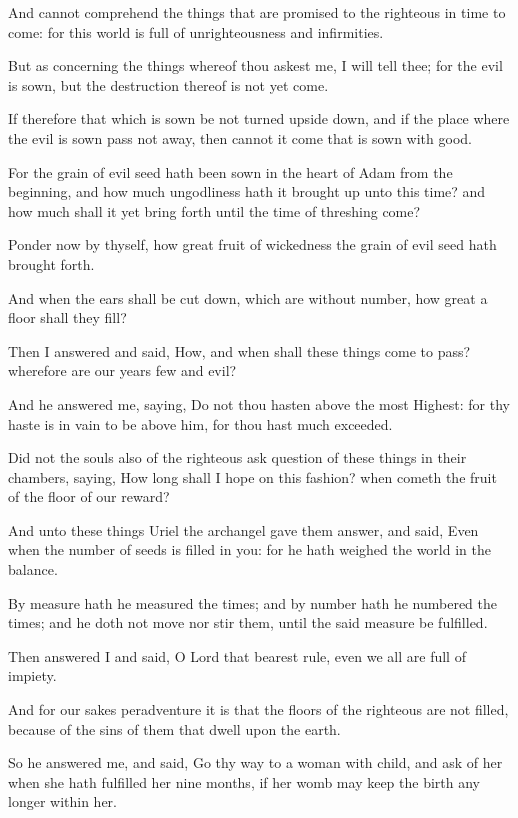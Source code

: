 {\par }{\PP {}And cannot comprehend the things that are promised to the righteous in time to come: for this world is full of unrighteousness and infirmities.
\par }{\PP {}But as concerning the things whereof thou askest me, I will tell thee; for the evil is sown, but the destruction thereof is not yet come.
\par }{\PP {}If therefore that which is sown be not turned upside down, and if the place where the evil is sown pass not away, then cannot it come that is sown with good.
\par }{\PP {}For the grain of evil seed hath been sown in the heart of Adam from the beginning, and how much ungodliness hath it brought up unto this time? and how much shall it yet bring forth until the time of threshing come?
\par }{\PP {}Ponder now by thyself, how great fruit of wickedness the grain of evil seed hath brought forth.
\par }{\PP {}And when the ears shall be cut down, which are without number, how great a floor shall they fill?
\par }{\PP {}Then I answered and said, How, and when shall these things come to pass? wherefore are our years few and evil?
\par }{\PP {}And he answered me, saying, Do not thou hasten above the most Highest: for thy haste is in vain to be above him, for thou hast much exceeded.
\par }{\PP {}Did not the souls also of the righteous ask question of these things in their chambers, saying, How long shall I hope on this fashion? when cometh the fruit of the floor of our reward?
\par }{\PP {}And unto these things Uriel the archangel gave them answer, and said, Even when the number of seeds is filled in you: for he hath weighed the world in the balance.
\par }{\PP {}By measure hath he measured the times; and by number hath he numbered the times; and he doth not move nor stir them, until the said measure be fulfilled.
\par }{\PP {}Then answered I and said, O Lord that bearest rule, even we all are full of impiety.
\par }{\PP {}And for our sakes peradventure it is that the floors of the righteous are not filled, because of the sins of them that dwell upon the earth.
\par }{\PP {}So he answered me, and said, Go thy way to a woman with child, and ask of her when she hath fulfilled her nine months, if her womb may keep the birth any longer within her.
}
